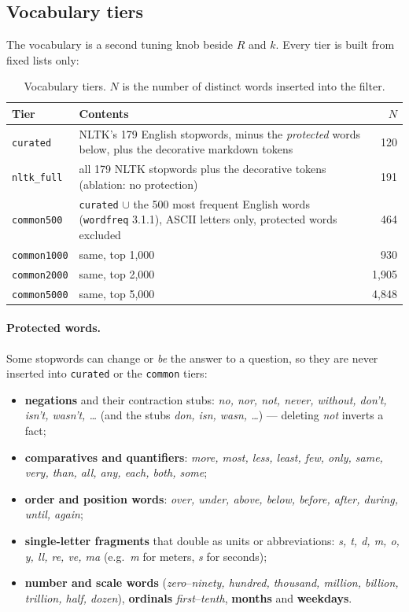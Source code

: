 \documentclass[11pt]{article}
\newcommand{\code}[1]{\texttt{#1}}
\begin{document}
\subsection{Vocabulary tiers}
The vocabulary is a second tuning knob beside $R$ and $k$. Every tier is built from fixed lists only:

\begin{table}[h]
\centering
\small
\begin{tabular}{@{}lp{9.6cm}r@{}}
\toprule
Tier & Contents & $N$ \\
\midrule
\code{curated} & NLTK's 179 English stopwords, minus the \emph{protected} words below, plus the
  decorative markdown tokens & 120 \\
\code{nltk\_full} & all 179 NLTK stopwords plus the decorative tokens (ablation: no protection) & 191 \\
\code{common500} & \code{curated} $\cup$ the 500 most frequent English words (\code{wordfreq} 3.1.1),
  ASCII letters only, protected words excluded & 464 \\
\code{common1000} & same, top 1{,}000 & 930 \\
\code{common2000} & same, top 2{,}000 & 1{,}905 \\
\code{common5000} & same, top 5{,}000 & 4{,}848 \\
\bottomrule
\end{tabular}
\caption{Vocabulary tiers. $N$ is the number of distinct words inserted into the filter.}
\label{tab:tiers}
\end{table}

\paragraph{Protected words.} Some stopwords can change or \emph{be} the answer to a question, so they
are never inserted into \code{curated} or the \code{common} tiers:
\begin{itemize}
  \item \textbf{negations} and their contraction stubs: \emph{no, nor, not, never, without, don't,
        isn't, wasn't, \dots} (and the stubs \emph{don, isn, wasn, \dots}) --- deleting \emph{not}
        inverts a fact;
  \item \textbf{comparatives and quantifiers}: \emph{more, most, less, least, few, only, same, very,
        than, all, any, each, both, some};
  \item \textbf{order and position words}: \emph{over, under, above, below, before, after, during,
        until, again};
  \item \textbf{single-letter fragments} that double as units or abbreviations: \emph{s, t, d, m, o,
        y, ll, re, ve, ma} (e.g.\ \emph{m} for meters, \emph{s} for seconds);
  \item \textbf{number and scale words} (\emph{zero}--\emph{ninety, hundred, thousand, million,
        billion, trillion, half, dozen}), \textbf{ordinals} \emph{first}--\emph{tenth},
        \textbf{months} and \textbf{weekdays}.
\end{itemize}
\end{document}
